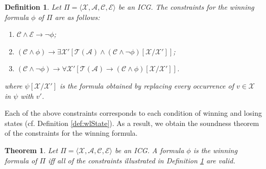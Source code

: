 \documentclass[review]{elsarticle}
\newcommand{\tuple}[1]{\langle {#1} \rangle}
\newcommand{\statevar}{\mathcal{X}}
\newcommand{\act}{\mathcal{A}}
\newcommand{\trans}{\mathcal{T}}
\newcommand{\constraint}{\mathcal{C}}
\newcommand{\estate}{\mathcal{E}}
\newtheorem{definition}{Definition}
\newtheorem{theorem}{Theorem}
\begin{document}
    
    
	\begin{definition}\label{def:consWinForm} \rm
		Let $\Pi = \tuple{\statevar, \act, \constraint, \estate}$ be an ICG.
		The constraints for the winning formula $\phi$ of $\Pi$ are as follows:
		\begin{enumerate}
			\item $\constraint \land \estate \rightarrow \neg \phi$;
			\item $(\constraint \land \phi) \rightarrow \exists \statevar' [\trans(\act) \land (\constraint \land \neg \phi)[\statevar/\statevar']]$;
			\item $(\constraint \land \neg \phi) \rightarrow \forall \statevar' [\trans(\act) \rightarrow (\constraint \land \phi)[\statevar/\statevar']]$.
		\end{enumerate}
		where $\psi[\statevar/\statevar']$ is the formula obtained by replacing every occurrence of $v \in \statevar$ in $\psi$ with $v'$.
	\end{definition}

	Each of the above constraints corresponds to each condition of winning and losing states (cf. Definition \ref{def:wlState}).
	As a result, we obtain the soundness theorem of the constraints for the winning formula.
	\begin{theorem} \label{thm:consWinForm} 
		Let $\Pi = \tuple{\statevar, \act, \constraint, \estate}$ be an ICG.
		A formula $\phi$ is the winning formula of $\Pi$ iff all of the constraints illustrated in Definition \ref{def:consWinForm} are valid.
	\end{theorem}
    
\end{document}
